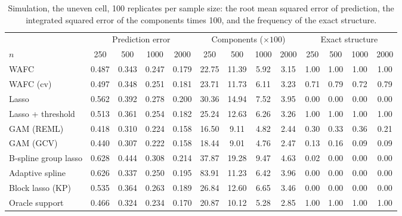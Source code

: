 \begin{table}[tp]
\caption{Simulation, the uneven cell, 100 replicates per sample size: the root mean squared error of prediction, the integrated squared error of the components times 100, and the frequency of the exact structure.}
\label{tab:sim-sizes-uneven}
\centering
\footnotesize
\setlength{\tabcolsep}{3pt}
\begin{tabular}{l cccc cccc cccc}
\hline
 & \multicolumn{4}{c}{Prediction error} & \multicolumn{4}{c}{Components ($\times 100$)} & \multicolumn{4}{c}{Exact structure} \\
$n$ & 250 & 500 & 1000 & 2000 & 250 & 500 & 1000 & 2000 & 250 & 500 & 1000 & 2000 \\
\hline
WAFC & 0.487 & 0.343 & 0.247 & 0.179 & 22.75 & 11.39 & 5.92 & 3.15 & 1.00 & 1.00 & 1.00 & 1.00 \\
WAFC (cv) & 0.497 & 0.348 & 0.251 & 0.181 & 23.71 & 11.73 & 6.11 & 3.23 & 0.71 & 0.79 & 0.72 & 0.79 \\
Lasso & 0.562 & 0.392 & 0.278 & 0.200 & 30.36 & 14.94 & 7.52 & 3.95 & 0.00 & 0.00 & 0.00 & 0.00 \\
Lasso + threshold & 0.513 & 0.361 & 0.254 & 0.182 & 25.24 & 12.63 & 6.26 & 3.26 & 1.00 & 1.00 & 1.00 & 1.00 \\
GAM (REML) & 0.418 & 0.310 & 0.224 & 0.158 & 16.50 & 9.11 & 4.82 & 2.44 & 0.30 & 0.33 & 0.36 & 0.21 \\
GAM (GCV) & 0.440 & 0.307 & 0.222 & 0.158 & 18.44 & 9.01 & 4.76 & 2.47 & 0.13 & 0.16 & 0.09 & 0.09 \\
B-spline group lasso & 0.628 & 0.444 & 0.308 & 0.214 & 37.87 & 19.28 & 9.47 & 4.63 & 0.02 & 0.00 & 0.00 & 0.00 \\
Adaptive spline & 0.626 & 0.337 & 0.250 & 0.195 & 83.91 & 11.23 & 6.42 & 3.96 & 0.00 & 0.00 & 0.00 & 0.00 \\
Block lasso (KP) & 0.535 & 0.364 & 0.263 & 0.189 & 26.84 & 12.60 & 6.65 & 3.46 & 0.00 & 0.00 & 0.00 & 0.00 \\
Oracle support & 0.466 & 0.324 & 0.234 & 0.170 & 20.87 & 10.12 & 5.28 & 2.85 & 1.00 & 1.00 & 1.00 & 1.00 \\
\hline
\end{tabular}
\end{table}

